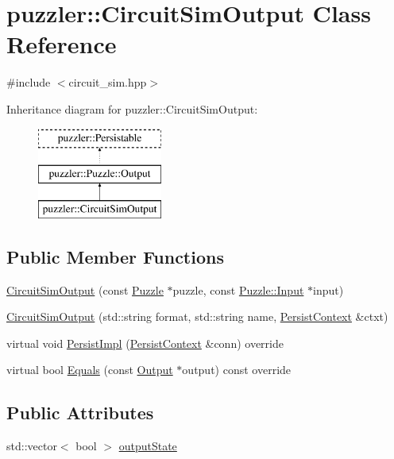 \hypertarget{a00004}{}\section{puzzler\+:\+:Circuit\+Sim\+Output Class Reference}
\label{a00004}


{\ttfamily \#include $<$circuit\+\_\+sim.\+hpp$>$}

Inheritance diagram for puzzler\+:\+:Circuit\+Sim\+Output\+:\begin{figure}[H]
\begin{center}
\leavevmode
\includegraphics[height=3.000000cm]{a00004}
\end{center}
\end{figure}
\subsection*{Public Member Functions}
\begin{DoxyCompactItemize}
\item 
\hyperlink{a00004_a7978efa770aa6eec46155023e57756ce}{Circuit\+Sim\+Output} (const \hyperlink{a00026}{Puzzle} $\ast$puzzle, const \hyperlink{a00009}{Puzzle\+::\+Input} $\ast$input)
\item 
\hyperlink{a00004_a247b5b230795778c2642c7eafaaa70e3}{Circuit\+Sim\+Output} (std\+::string format, std\+::string name, \hyperlink{a00025}{Persist\+Context} \&ctxt)
\item 
virtual void \hyperlink{a00004_a1ef9b85e5ddb881cc9d96f569485e245}{Persist\+Impl} (\hyperlink{a00025}{Persist\+Context} \&conn) override
\item 
virtual bool \hyperlink{a00004_a8bd3f7ad0aa2f0fd567db60571009dac}{Equals} (const \hyperlink{a00023_aa605318d3632c1b359c07745bdf17e83}{Output} $\ast$output) const override
\end{DoxyCompactItemize}
\subsection*{Public Attributes}
\begin{DoxyCompactItemize}
\item 
std\+::vector$<$ bool $>$ \hyperlink{a00004_ac8cb4373d4a1fb54dca1a3abcfb7cc90}{output\+State}
\end{DoxyCompactItemize}
